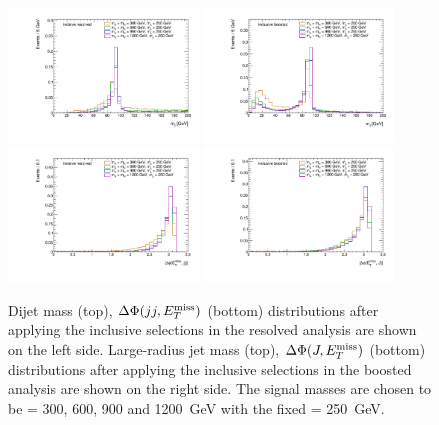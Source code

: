 \begin{figure}
\centering
\includegraphics[width=0.45\textwidth]{texinputs/04_grid/figures/monoz/hadronic/ma250_incl_resl_MJJ_linear.pdf}
\includegraphics[width=0.45\textwidth]{texinputs/04_grid/figures/monoz/hadronic/ma250_incl_merged_MFatJ1_linear.pdf}
\includegraphics[width=0.45\textwidth]{texinputs/04_grid/figures/monoz/hadronic/ma250_incl_resl_dPhiMETJJ_linear.pdf}
\includegraphics[width=0.45\textwidth]{texinputs/04_grid/figures/monoz/hadronic/ma250_incl_merged_dPhiMETJ_linear.pdf}
\caption{Dijet mass (top), $\Delta\Phi(jj, E_T^\mathrm{miss})$ (bottom) distributions 
after applying the inclusive selections in the resolved analysis are shown on the left side. Large-radius 
jet mass (top), $\Delta\Phi(J, E_T^\mathrm{miss})$ (bottom) distributions 
after applying the inclusive selections in the boosted analysis are shown on the right side. 
The signal masses are chosen to be \mA = 300, 600, 900 and 1200~GeV with the fixed \ma = 250~GeV.}
\label{fig:monozhad_kin_inc_fixed_ma}
\end{figure}

